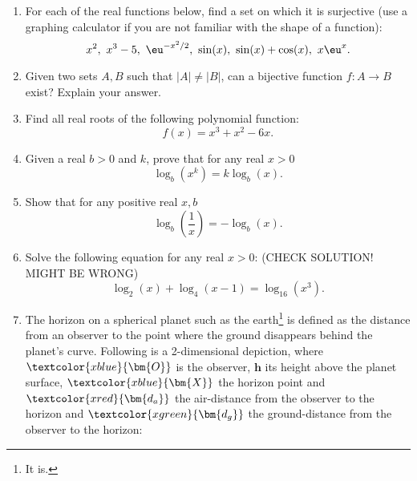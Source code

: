 \begin{enumerate}
	\item For each of the real functions below, find a set on which it is surjective (use a graphing calculator if you are not familiar with the shape of a function):
		\[
			x^{2},\ x^{3}-5,\ \eu^{-x^{2}/2},\ \sin(x),\ \sin(x)+\cos(x),\ x\eu^{x}.
		\]

	\item Given two sets $A,B$ such that $|A|\neq|B|$, can a bijective function $f:A\to B$ exist? Explain your answer.

	\item Find all real roots of the following polynomial function:
		\[
			f(x) = x^{3} + x^{2} - 6x.
		\]

	\item Given a real $b>0$ and $k$, prove that for any real $x>0$
		\[
			\log_{b} \left( x^{k} \right) = k\log_{b} \left( x \right).
		\]

	\item Show that for any positive real $x,b$
		\[
			\log_{b} \left( \frac{1}{x} \right) = -\log_{b}(x).
		\]

	\item Solve the following equation for any real $x>0$: (CHECK SOLUTION! MIGHT BE WRONG)
		\[
			\log_{2}(x) + \log_{4}(x-1) = \log_{16}\left(x^{3}\right).
		\]

	\item The horizon on a spherical planet such as the earth\footnote{It is.} is defined as the distance from an observer to the point where the ground disappears behind the planet's curve. Following is a 2-dimensional depiction, where $\textcolor{xblue}{\bm{O}}$ is the observer, $\bm{h}$ its height above the planet surface, $\textcolor{xblue}{\bm{X}}$ the horizon point and $\textcolor{xred}{\bm{d_{a}}}$ the air-distance from the observer to the horizon and $\textcolor{xgreen}{\bm{d_{g}}}$ the ground-distance from the observer to the horizon:

		\begin{center}
		\end{center}


\end{enumerate}
